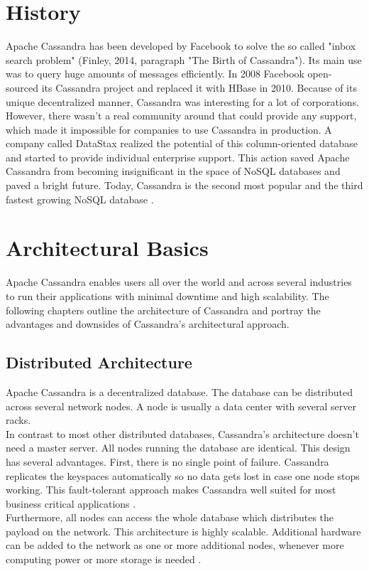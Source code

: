 \section{History}
Apache Cassandra has been developed by Facebook to solve the so called "inbox search problem" (Finley, 2014, paragraph "The Birth of Cassandra"). Its main use was to query huge amounts of messages efficiently. In 2008 Facebook open-sourced its Cassandra project and replaced it with HBase in 2010. Because of its unique decentralized manner, Cassandra was interesting for a lot of corporations. However, there wasn't a real community around that could provide any support, which made it impossible for companies to use Cassandra in production. A company called DataStax realized the potential of this column-oriented database and started to provide individual enterprise support. This action saved Apache Cassandra from becoming insignificant in the space of NoSQL databases and paved a bright future. Today, Cassandra is the second most popular and the third fastest growing NoSQL database \cite{history}.

\clearpage
\section{Architectural Basics}
Apache Cassandra enables users all over the world and across several industries to run their applications with minimal downtime and high scalability. The following chapters outline the architecture of Cassandra and portray the advantages and downsides of Cassandra's architectural approach.

\subsection{Distributed Architecture}
Apache Cassandra is a decentralized database. The database can be distributed across several network nodes. A node is usually a data center with several server racks. \\ 
In contrast to most other distributed databases, Cassandra's architecture doesn't need a master server. All nodes running the database are identical. This design has several advantages. First, there is no single point of failure. Cassandra replicates the keyspaces automatically so no data gets lost in case one node stops working. This fault-tolerant approach makes Cassandra well suited for most business critical applications \cite{architectureOverview} \cite{introCassandra}. \\
Furthermore, all nodes can access the whole database which distributes the payload on the network. This architecture is highly scalable. Additional hardware can be added to the network as one or more additional nodes, whenever more computing power or more storage is needed \cite{introCassandra}.


